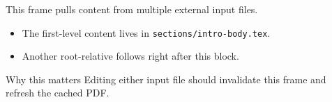 This frame pulls content from multiple external input files.

\begin{itemize}
  \item The first-level content lives in \texttt{sections/intro-body.tex}.
  \item Another root-relative \texttt{\string} follows right after this block.
\end{itemize}

\pause

\begin{block}{Why this matters}
Editing either input file should invalidate this frame and refresh the cached PDF.
\end{block}